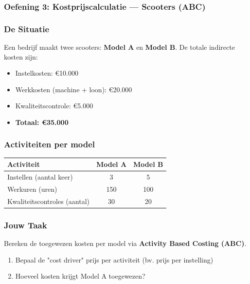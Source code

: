 \documentclass[a4paper,11pt]{article}
\begin{document}
\begin{oefenblok}
    \subsubsection*{Oefening 3: Kostprijscalculatie — Scooters (ABC)}

    \subsubsection*{De Situatie}
    Een bedrijf maakt twee scooters: \textbf{Model A} en \textbf{Model B}. De totale indirecte kosten zijn:
    \begin{itemize}
        \item Instelkosten: €10.000
        \item Werkkosten (machine + loon): €20.000
        \item Kwaliteitscontrole: €5.000
        \item \textbf{Totaal: €35.000}
    \end{itemize}

    \subsubsection*{Activiteiten per model}
    \begin{center}
        \begin{tabular}{|l|c|c|}
            \hline
            \textbf{Activiteit}          & \textbf{Model A} & \textbf{Model B} \\
            \hline
            Instellen (aantal keer)      & 3                & 5                \\
            \hline
            Werkuren (uren)              & 150              & 100              \\
            \hline
            Kwaliteitscontroles (aantal) & 30               & 20               \\
            \hline
        \end{tabular}
    \end{center}

    \subsubsection*{Jouw Taak}
    Bereken de toegewezen kosten per model via \textbf{Activity Based Costing (ABC)}.
    \begin{enumerate}
        \item Bepaal de "cost driver" prijs per activiteit (bv. prijs per instelling)
        \item Hoeveel kosten krijgt Model A toegewezen?
    \end{enumerate}


\end{oefenblok}
\end{document}
